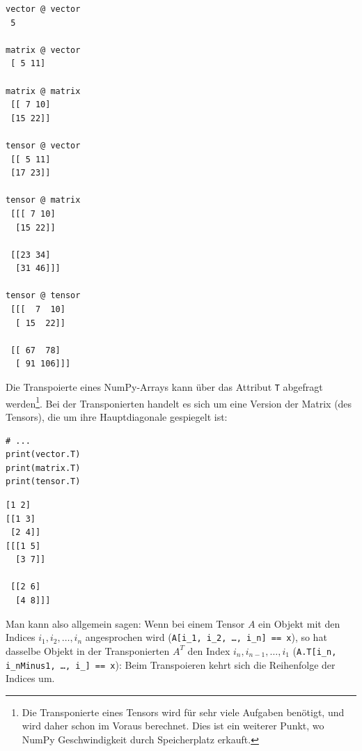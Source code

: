 \begin{cmdbox}
\begin{verbatim}
vector @ vector
 5

matrix @ vector
 [ 5 11]

matrix @ matrix
 [[ 7 10]
 [15 22]]

tensor @ vector
 [[ 5 11]
 [17 23]]
 
tensor @ matrix
 [[[ 7 10]
  [15 22]]

 [[23 34]
  [31 46]]]

tensor @ tensor
 [[[  7  10]
  [ 15  22]]

 [[ 67  78]
  [ 91 106]]]
\end{verbatim}
\end{cmdbox}

Die Transpoierte eines NumPy-Arrays kann über das Attribut \texttt{T} abgefragt werden\footnote{Die Transponierte eines Tensors wird für sehr viele Aufgaben benötigt, und wird daher schon im Voraus berechnet. Dies ist ein weiterer Punkt, wo NumPy Geschwindigkeit durch Speicherplatz erkauft.}. Bei der Transponierten handelt es sich um eine Version der Matrix (des Tensors), die um ihre Hauptdiagonale gespiegelt ist:

\begin{tcbraster}[raster columns=2,
                  raster equal height,
                  nobeforeafter,
                  raster column skip=0.5cm]
\begin{codebox}
\begin{verbatim}
# ...
print(vector.T)
print(matrix.T)
print(tensor.T)
\end{verbatim}
\end{codebox}
%
\begin{cmdbox}
\begin{verbatim}
[1 2]
[[1 3]
 [2 4]]
[[[1 5]
  [3 7]]

 [[2 6]
  [4 8]]]
\end{verbatim}
\end{cmdbox}
\end{tcbraster}

Man kann also allgemein sagen: Wenn bei einem Tensor $A$ ein Objekt mit den Indices $i_1, i_2, \ldots, i_n$ angesprochen wird (\texttt{A[i\_1, i\_2, \ldots, i\_n] == x}), so hat dasselbe Objekt in der Transponierten $A^{T}$ den Index $i_n, i_{n-1}, \ldots, i_1$ (\texttt{A.T[i\_n, i\_nMinus1, \ldots, i\_] == x}): Beim Transpoieren kehrt sich die Reihenfolge der Indices um.

